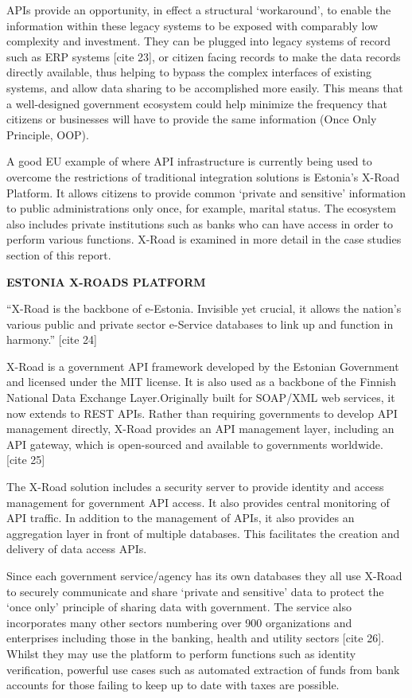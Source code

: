 APIs provide an opportunity, in effect a structural ‘workaround’, to enable the
information within these legacy systems to be exposed with comparably low complexity
and investment. They can be plugged into legacy systems of record such as ERP
systems [cite 23], or citizen facing records to make the data records directly
available, thus helping to bypass the complex interfaces of existing systems,
and allow data sharing to be accomplished more easily. This means that a
well-designed government ecosystem could help minimize the frequency that
citizens or businesses will have to provide the same information (Once Only
Principle, OOP).

A good EU example of where API infrastructure is currently being used to overcome
the restrictions of traditional integration solutions is Estonia’s X-Road Platform.
It allows citizens to provide common ‘private and sensitive’ information to public administrations only once, for example, marital status. The ecosystem also includes
private institutions such as banks who can have access in order to perform various
functions. X-Road is examined in more detail in the case studies section of this report.

\textbf{ESTONIA X-ROADS PLATFORM}

“X-Road is the backbone of e-Estonia. Invisible yet crucial, it allows the
nation’s various public and private sector e-Service databases to link up and
function in harmony.” [cite 24]

X-Road is a government API framework developed by the Estonian Government
and licensed under the MIT license. It is also used as a backbone of the Finnish
National Data Exchange Layer.Originally built for SOAP/XML web services, it now
extends to REST APIs. Rather than requiring governments to develop API management
directly, X-Road provides an API management layer, including an API gateway,
which is open-sourced and available to governments worldwide. [cite 25]

The X-Road solution includes a security server to provide identity and access
management for government API access. It also provides central monitoring of
API traffic. In addition to the management of APIs, it also provides an
aggregation layer in front of multiple databases. This facilitates the creation
and delivery of data access APIs.

Since each government service/agency has its own databases they all use X-Road
to securely communicate and share ‘private and sensitive’ data to protect the
‘once only’ principle of sharing data with government. The service also incorporates
many other sectors numbering over 900 organizations and enterprises including those
in the banking, health and utility sectors [cite 26]. Whilst they may use the platform to
perform functions such as identity verification, powerful use cases such as automated extraction of funds from bank accounts for those failing to keep up to date with
taxes are possible.

